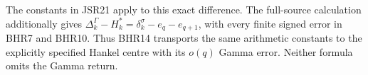 The constants in JSR21 apply to this exact difference.
The full-source calculation additionally gives
$\Delta_k^\Gamma-H_k^*=\delta_k^\sigma-e_q-e_{q+1}$,
with every finite signed error in BHR7 and BHR10.
Thus BHR14 transports the same arithmetic constants to
the explicitly specified Hankel centre with its $o(q)$
Gamma error. Neither formula omits the Gamma return.